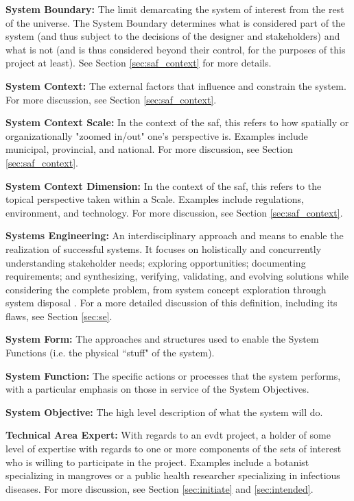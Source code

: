 \textbf{System Boundary:} The limit demarcating the system of interest from the rest of the universe. The System Boundary determines what is considered part of the system (and thus subject to the decisions of the designer and stakeholders) and what is not (and is thus considered beyond their control, for the purposes of this project at least). See Section \ref{sec:saf_context} for more details.

\textbf{System Context:} The external factors that influence and constrain the system. For more discussion, see Section \ref{sec:saf_context}.

\textbf{System Context Scale:} In the context of the \ac{saf}, this refers to how spatially or organizationally "zoomed in/out" one's perspective is. Examples include municipal, provincial, and national. For more discussion, see Section \ref{sec:saf_context}.

\textbf{System Context Dimension:} In the context of the \ac{saf}, this refers to the topical perspective taken within a Scale. Examples include regulations, environment, and technology. For more discussion, see Section \ref{sec:saf_context}.

\textbf{Systems Engineering:} An interdisciplinary approach and means to enable the realization of successful systems. It focuses on holistically and concurrently understanding stakeholder needs; exploring opportunities; documenting requirements; and synthesizing, verifying, validating, and evolving solutions while considering the complete problem, from system concept exploration through system disposal \cite{systemsengineeringbodyofknowledgeSystemsEngineeringGlossary2021}. 
For a more detailed discussion of this definition, including its flaws, see Section \ref{sec:se}.

\textbf{System Form:} The approaches and structures used to enable the System Functions (i.e. the physical ``stuff" of the system).

\textbf{System Function:} The specific actions or processes that the system performs, with a particular emphasis on those in service of the System Objectives.

\textbf{System Objective:} The high level description of what the system will do.

\textbf{Technical Area Expert:} With regards to an \ac{evdt} project, a holder of some level of expertise with regards to one or more components of the \ac{sets} of interest who is willing to participate in the project. Examples include a botanist specializing in mangroves or a public health researcher specializing in infectious diseases. For more discussion, see Section \ref{sec:initiate} and \ref{sec:intended}.

